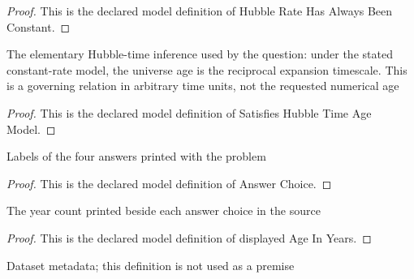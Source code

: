 \begin{proof}
  This is the declared model definition of Hubble Rate Has Always Been Constant.
\end{proof}
\begin{definition}
  \label{def:physics:phyx-mini-0923:phyxminiproblems-problemphyxmini0923-satisfieshubbletimeagemodel}
  The elementary Hubble-time inference used by the question: under the stated constant-rate model, the universe age is the reciprocal expansion timescale. This is a governing relation in arbitrary time units, not the requested numerical age
\end{definition}
\begin{proof}
  This is the declared model definition of Satisfies Hubble Time Age Model.
\end{proof}
\begin{definition}
  \label{def:physics:phyx-mini-0923:phyxminiproblems-problemphyxmini0923-answerchoice}
  Labels of the four answers printed with the problem
\end{definition}
\begin{proof}
  This is the declared model definition of Answer Choice.
\end{proof}
\begin{definition}
  \label{def:physics:phyx-mini-0923:phyxminiproblems-problemphyxmini0923-displayedageinyears}
  The year count printed beside each answer choice in the source
\end{definition}
\begin{proof}
  This is the declared model definition of displayed Age In Years.
\end{proof}
\begin{definition}
  \label{def:physics:phyx-mini-0923:phyxminiproblems-problemphyxmini0923-recordedanswerchoice}
  Dataset metadata; this definition is not used as a premise
\end{definition}

